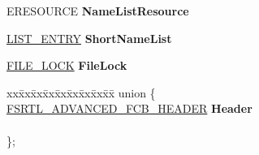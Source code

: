 \begin{DoxyCompactItemize}
\mbox{\label{struct___f_c_b_a9714f1542ed861d719ecd69010f4098e}} 
E\+R\+E\+S\+O\+U\+R\+CE {\bfseries Name\+List\+Resource}
\item 
\mbox{\label{struct___f_c_b_ae0589463276cad4e26ad31232a93aff0}} 
\hyperlink{struct___l_i_s_t___e_n_t_r_y}{L\+I\+S\+T\+\_\+\+E\+N\+T\+RY} {\bfseries Short\+Name\+List}
\item 
\mbox{\label{struct___f_c_b_a945e5d2db55c4dd3df4e1f46bbb664be}} 
\hyperlink{struct___f_i_l_e___l_o_c_k}{F\+I\+L\+E\+\_\+\+L\+O\+CK} {\bfseries File\+Lock}
\item 
\mbox{\label{struct___f_c_b_ae4289abb8cc194f7fe9c57a10e95344c}} 
\begin{tabbing}
xx\=xx\=xx\=xx\=xx\=xx\=xx\=xx\=xx\=\kill
union \{\\
\>\hyperlink{struct___f_s_r_t_l___a_d_v_a_n_c_e_d___f_c_b___h_e_a_d_e_r}{FSRTL\_ADVANCED\_FCB\_HEADER} {\bfseries Header}\\
\\
\}; \\


\end{tabbing}
\end{DoxyCompactItemize}
